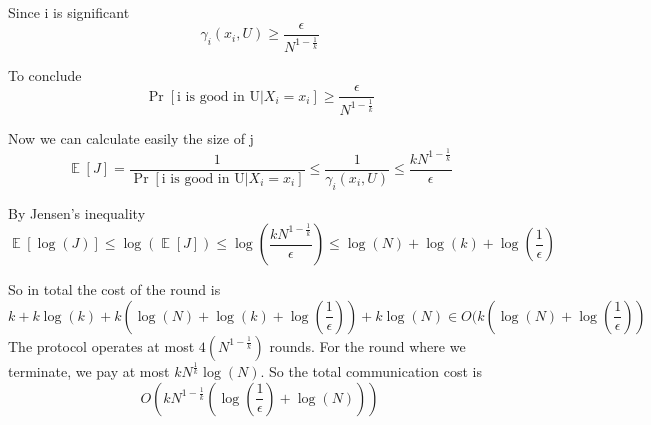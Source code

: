 Since i is significant
\begin{equation*}
    \gamma_i(x_i, U) \geq \frac{\epsilon}{N^{1-\frac{1}{k}}}
\end{equation*}

To conclude
\begin{equation*}
    \Pr[\text{i is good in U}| X_i = x_i] \geq \frac{\epsilon}{N^{1-\frac{1}{k}}}
\end{equation*}

Now we can calculate easily the size of j
\begin{equation*}
    \mathop{\mathbb{E}} [J] = \frac{1}{\Pr[\text{i is good in U}| X_i = x_i]} \leq \frac{1}{\gamma_i(x_i, U)} \leq \frac{kN^{1-\frac{1}{k}}}{\epsilon}
\end{equation*}

By Jensen's inequality
\begin{equation*}
    \mathop{\mathbb{E}} [\log(J)] \leq \log(\mathop{\mathbb{E}} [J]) \leq \log(\frac{kN^{1-\frac{1}{k}}}{\epsilon}) \leq \log(N) + \log(k) + \log(\frac{1}{\epsilon})
\end{equation*}

So in total the cost of the round is 
\begin{equation*}
    k + k\log(k) + k(\log(N) + \log(k) + \log(\frac{1}{\epsilon})) + k\log(N) \in O(k(\log(N) + \log(\frac{1}{\epsilon}))
\end{equation*}
The protocol operates at most $4(N^{1-\frac{1}{k}})$ rounds. \newline
For the round where we terminate, we pay at most $kN^{\frac{1}{k}} \log(N)$. \newline
So the total communication cost is  
\begin{equation*}
    O(kN^{1-\frac{1}{k}}(\log(\frac{1}{\epsilon}) + \log(N)))
\end{equation*}